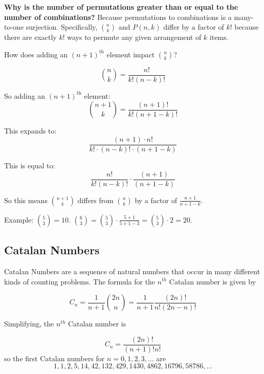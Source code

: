 \documentclass[12pt]{article}
\begin{document}
\textbf{Why is the number of permutations greater than or equal to the number of combinations?} Because permutations to combinations is a many-to-one surjection. Specifically, \(\binom{n}{k}\) and \(P(n,k)\) differ by a factor of \(k!\) because there are exactly \(k!\) ways to permute any given arrangement of \(k\) items.

How does adding an \((n+1)^{\text{th}}\) element impact \(\binom{n}{k}\)?

\[
\binom{n}{k} = \frac{n!}{k!(n-k)!}
\]

So adding an \((n+1)^{\text{th}}\) element:
\[
\binom{n+1}{k} = \frac{(n+1)!}{k!(n+1-k)!}
\]

This expands to:
\[
\frac{(n+1)\cdot n!}{k! \cdot (n-k)! \cdot (n+1-k)}
\]

This is equal to:
\[
\frac{n!}{k!(n-k)!} \cdot \frac{(n+1)}{(n+1-k)}
\]

So this means \(\binom{n+1}{k}\) differs from \(\binom{n}{k}\) by a factor of \(\frac{n+1}{n+1-k}\).

Example: \(\binom{5}{3} = 10\).  
\(\binom{6}{3} = \binom{5}{3} \cdot \frac{5+1}{5+1-3} = \binom{5}{3} \cdot 2 = 20\).

\subsection{Catalan Numbers}
Catalan Numbers are a sequence of natural numbers that occur in many different kinds of counting problems. The formula for the \(n^{th}\) Catalan number is given by

\[
C_n = \frac{1}{n+1} \binom{2n}{n} = \frac{1}{n+1} \frac{(2n)!}{n!(2n - n)!}
\]

Simplifying, the \(n^{th}\) Catalan number is

\[
C_n = \frac{(2n)!}{(n+1)!n!}
\]
so the first Catalan numbers for \(n=0, 1, 2, 3, \ldots\) are
\[1, 1, 2, 5, 14, 42, 132, 429, 1430, 4862, 16796, 58786, \ldots\]
\end{document}
